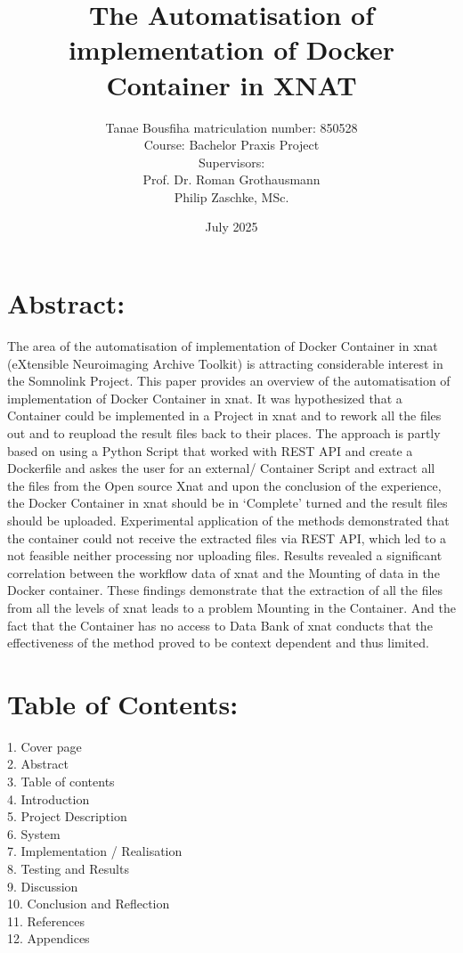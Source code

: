 \documentclass{article}
\title{The Automatisation of implementation of Docker Container in XNAT}
\author{Tanae Bousfiha matriculation number: 850528 \\ Course: Bachelor Praxis Project\\ Supervisors:\\Prof. Dr. Roman Grothausmann\\
Philip Zaschke, MSc.}
\date{July 2025}
\begin{document}
\maketitle
\newpage

\section{Abstract:}
The area of the automatisation of implementation of Docker Container in xnat (eXtensible Neuroimaging Archive Toolkit) is attracting considerable interest in the Somnolink Project. This paper provides an overview of the automatisation of implementation of Docker Container in xnat. It was hypothesized that a Container could be implemented in a Project in xnat and to rework all the files out and to reupload the result files back to their places. The approach is partly based on using a Python Script that worked with REST API and create a Dockerfile and askes the user for an external/ Container Script and extract all the files from the Open source Xnat and upon the conclusion of the experience, the Docker Container in xnat should be in ‘Complete’ turned and the result files should be uploaded. Experimental application of the methods demonstrated that the container could not receive the extracted files via REST API, which led to a not feasible neither processing nor uploading files. Results revealed a significant correlation between the workflow data of xnat and the Mounting of data in the Docker container. These findings demonstrate that the extraction of all the files from all the levels of xnat leads to a problem Mounting in the Container. And the fact that the Container has no access to Data Bank of xnat conducts that the effectiveness of the method proved to be context dependent and thus limited.
 \newpage

 \section{Table of Contents:}
1.	Cover page \\
2.	Abstract \\
3.	Table of contents\\
4.	Introduction \\
5.	Project Description \\
6.	System \\
7.	Implementation / Realisation \\
8.	Testing and Results\\
9.	Discussion \\
10.	Conclusion and Reflection \\
11.	References \\
12.	Appendices \\
\newpage
\end{document}

